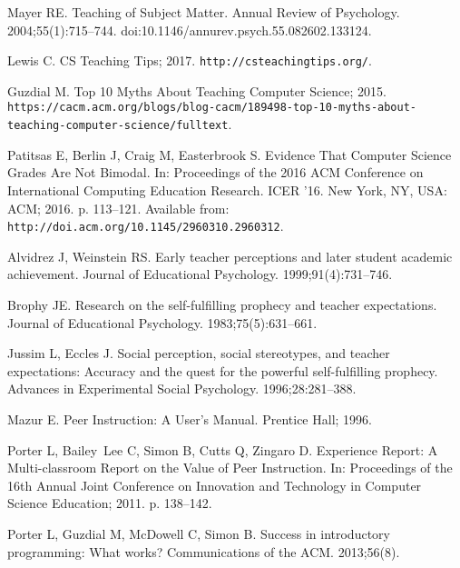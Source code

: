 \documentclass[10pt,letterpaper]{article}
\newcommand{\url}[1]{\texttt{#1}}
\begin{document}
\pagebreak

% 

\begin{thebibliography}{10}

Mayer RE.
\newblock Teaching of Subject Matter.
\newblock Annual Review of Psychology. 2004;55(1):715--744.
\newblock doi:{10.1146/annurev.psych.55.082602.133124}.

Lewis C. CS Teaching Tips; 2017.
\newblock \texttt{http://csteachingtips.org/}.

Guzdial M. Top 10 Myths About Teaching Computer Science; 2015.
\newblock
  \texttt{https://cacm.acm.org/blogs/blog-cacm/189498-top-10-myths-about-teaching-computer-science/fulltext}.

Patitsas E, Berlin J, Craig M, Easterbrook S.
\newblock Evidence That Computer Science Grades Are Not Bimodal.
\newblock In: Proceedings of the 2016 ACM Conference on International Computing
  Education Research. ICER '16. New York, NY, USA: ACM; 2016. p. 113--121.
\newblock Available from: \url{http://doi.acm.org/10.1145/2960310.2960312}.

Alvidrez J, Weinstein RS.
\newblock Early teacher perceptions and later student academic achievement.
\newblock Journal of Educational Psychology. 1999;91(4):731--746.

Brophy JE.
\newblock Research on the self-fulfilling prophecy and teacher expectations.
\newblock Journal of Educational Psychology. 1983;75(5):631--661.

Jussim L, Eccles J.
\newblock Social perception, social stereotypes, and teacher expectations:
  Accuracy and the quest for the powerful self-fulfilling prophecy.
\newblock Advances in Experimental Social Psychology. 1996;28:281--388.

Mazur E.
\newblock Peer Instruction: A User's Manual.
\newblock Prentice Hall; 1996.

Porter L, Bailey~Lee C, Simon B, Cutts Q, Zingaro D.
\newblock Experience Report: A Multi-classroom Report on the Value of Peer
  Instruction.
\newblock In: Proceedings of the 16th Annual Joint Conference on Innovation and
  Technology in Computer Science Education; 2011. p. 138--142.

Porter L, Guzdial M, McDowell C, Simon B.
\newblock Success in introductory programming: What works?
\newblock Communications of the ACM. 2013;56(8).


\end{thebibliography}
\end{document}
